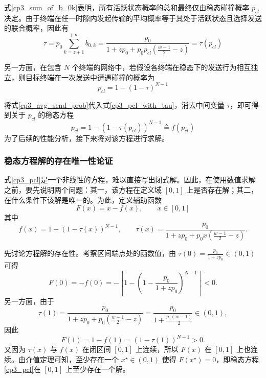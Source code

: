 式\eqref{cp3_sum_of_b_0k}表明，所有活跃状态概率的总和最终仅由稳态碰撞概率 $p_{cl}$ 决定。由于终端在任一时隙内发起传输的平均概率等于其处于活跃状态且选择发送的联合概率，因此有
\begin{equation}\label{cp3_avg_send_prob}
    \tau=p_0\sum_{k=z+1}^{+\infty}b_{0,k}=\frac{p_0}{1+zp_0+p_0p_{cl}(\frac{w-1}{2}-z)}=\tau(p_{cl})
\end{equation}

另一方面，在包含 $N$ 个终端的网络中，若假设各终端在稳态下的发送行为相互独立，则目标终端在一次发送中遭遇碰撞的概率为
\begin{equation}\label{cp3_pcl_with_tau}
    p_{cl} = 1- (1-\tau)^{N-1}
\end{equation}

将式\eqref{cp3_avg_send_prob}代入式\eqref{cp3_pcl_with_tau}，消去中间变量 $\tau$，即可得到关于 $p_{cl}$ 的稳态方程
\begin{equation}\label{cp3_pcl}
    p_{cl} = 1 - (1 - \tau(p_{cl}))^{N-1} \triangleq f(p_{cl})
\end{equation}
为了后续的性能分析，接下来将对该方程进行求解。

\subsubsection{稳态方程解的存在唯一性论证}

式\eqref{cp3_pcl}是一个非线性的方程，难以直接写出闭式解。因此，在使用数值求解之前，要先说明两个问题：其一，该方程在定义域 $[0,1]$ 上是否存在解；其二，在什么条件下该解是唯一的。为此，定义辅助函数
\begin{equation}
    F(x)=x-f(x), \qquad x\in[0,1]
\end{equation}
其中
\begin{equation}
    f(x)=1-\left(1-\tau(x)\right)^{N-1}, \qquad
    \tau(x)=\frac{p_0}{1+zp_0+p_0x\left(\frac{w-1}{2}-z\right)}.
\end{equation}

先讨论方程解的存在性。考察区间端点处的函数值，由 $\tau(0)=\frac{p_0}{1+zp_0}\in(0,1)$ 可得
\begin{equation}
    F(0)=-f(0)=-\left[1-\left(1-\frac{p_0}{1+zp_0}\right)^{N-1}\right]<0.
\end{equation}
另一方面，由于
\[
\tau(1)=\frac{p_0}{1+zp_0+p_0\left(\frac{w-1}{2}-z\right)}
=\frac{p_0}{1+\frac{p_0(w-1)}{2}}\in(0,1),
\]
因此
\begin{equation}
    F(1)=1-f(1)=\left(1-\tau(1)\right)^{N-1}>0.
\end{equation}
又因为 $\tau(x)$ 与 $f(x)$ 在闭区间 $[0,1]$ 上连续，所以 $F(x)$ 在 $[0,1]$ 上也连续。由介值定理可知，至少存在一个 $x^\star\in(0,1)$ 使得 $F(x^\star)=0$，即稳态方程\eqref{cp3_pcl}在 $[0,1]$ 上至少存在一个解。

